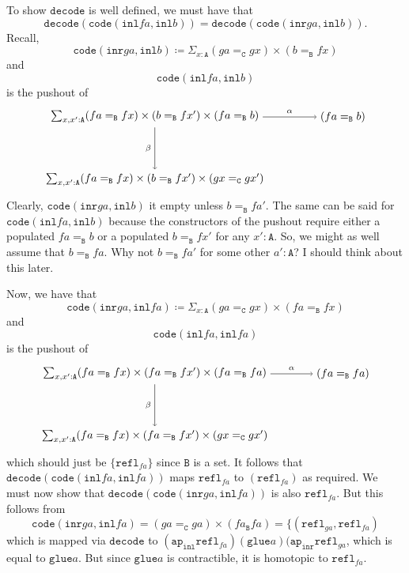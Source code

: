 \message{ !name(notes.tex)}\documentclass[12pt]{amsart}
\newcommand{\type}[1]{\mathtt{#1}}
\newcommand{\A}{\type{A}}
\newcommand{\B}{\type{B}}
\newcommand{\C}{\type{C}}
\newcommand{\ap}{\type{ap}}
\newcommand{\inl}{\type{inl}}
\newcommand{\inr}{\type{inr}}
\newcommand{\glue}{\type{glue}}
\newcommand{\refl}{\type{refl}}
\newcommand{\code}{\type{code}}
\newcommand{\decode}{\type{decode}}
\theoremstyle{remark}
\theoremstyle{definition}
\begin{document}
To show \( \decode \)  is well defined, we must have that 
\[
  \decode ( \code (\inl fa,\inl b) ) = \decode ( \code (\inr ga, \inl b) ).
\]
Recall,  
\[
  \code (\inr ga, \inl b) \coloneqq \Sigma_{x:\A} ( ga =_{\C} gx)
  \times ( b =_{\B} fx )
\]
and
\[
  \code ( \inl fa, \inl b)
\]
is the pushout of
\[
\begin{tikzpicture}
	\node (1) at (0,2) 
		{ $ \sum_{ x , x' : \A } 
			( fa =_{\B} fx ) 
			\times ( b =_{\B} fx' ) 
			\times ( fa =_{\B} b ) $ };
	\node (2) at (6,2) 
		{ $ ( fa =_{\B} b ) $ };
	\node (3) at (0,0) 
		{ $ \sum_{ x , x' : \A } 
			( fa =_{\B} fx ) 
			\times  (b =_{\B} fx' ) 
			\times ( gx =_{\C} gx') $ };
	\draw [ -> ] (1) to 
		node [above] {\scriptsize $ \alpha $} 
		(2);
	\draw [ -> ] (1) to 
		node [left] {\scriptsize $ \beta $}
		(3);
\end{tikzpicture}
\]
Clearly, \( \code ( \inr ga, \inl b ) \) it empty unless \( b =_{\B}
fa' \). The same can be said for \( \code ( \inl fa , \inl b ) \)
because the constructors of the pushout require either a populated \(
fa =_{\B} b \) or a populated \( b =_{\B} fx' \) for any \( x' : \A
\). So, we might as well assume that \( b =_{\B} fa \).  Why not \( b
=_{\B} fa' \) for some other \( a' : \A \)? I should think about this
later.

Now, we have that
\[
  \code (\inr ga, \inl fa) \coloneqq \Sigma_{x:\A} ( ga =_{\C} gx)
  \times ( fa =_{\B} fx )
\]
and
\[
  \code ( \inl fa, \inl fa)
\]
is the pushout of
\[
\begin{tikzpicture}
	\node (1) at (0,2) 
		{ $ \sum_{ x , x' : \A } 
			( fa =_{\B} fx ) 
			\times ( fa =_{\B} fx' ) 
			\times ( fa =_{\B} fa ) $ };
	\node (2) at (6,2) 
		{ $ ( fa =_{\B} fa ) $ };
	\node (3) at (0,0) 
		{ $ \sum_{ x , x' : \A } 
			( fa =_{\B} fx ) 
			\times  (fa =_{\B} fx' ) 
			\times ( gx =_{\C} gx') $ };
	\draw [ -> ] (1) to 
		node [above] {\scriptsize $ \alpha $} 
		(2);
	\draw [ -> ] (1) to 
		node [left] {\scriptsize $ \beta $}
		(3);
\end{tikzpicture}
\]
which should just be \( \{ \refl_{fa} \} \) since \( \B \) is a set.
It follows that \( \decode ( \code ( \inl fa , \inl fa ) ) \) maps \(
\refl_{fa} \) to \( (\refl_{fa}) \) as required.  We must now show
that \( \decode ( \code ( \inr ga , \inl fa ) ) \) is also \(
\refl_{fa} \).  But this follows from
\[
  \code ( \inr ga , \inl fa ) = (ga =_{\C} ga) \times ( fa _{\B} fa )
  = \{(\refl_{ga}, \refl_{fa})
\]
which is mapped via \( \decode \) to \( ( \ap_{\inl} \refl_{fa} ) (
\glue a ) ( \ap_{\inr} \refl_{ga} \), which is equal to \( \glue a \).
But since \( \glue a \) is contractible, it is homotopic to \( \refl_{fa} \).   
\end{document}
